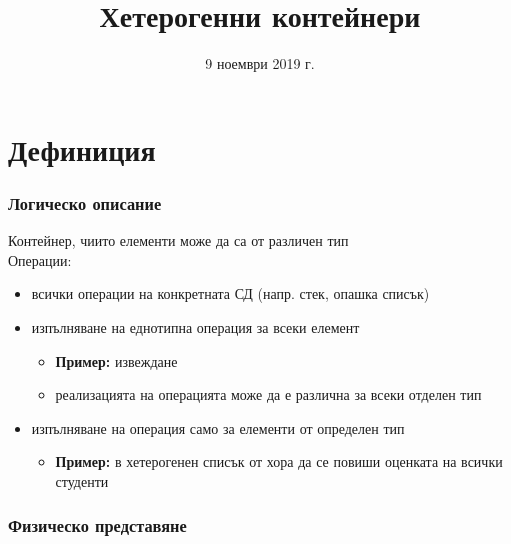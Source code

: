 \documentclass[alsotrans]{beamerswitch}
\title{Хетерогенни контейнери}
\date{9 ноември 2019 г.}
\begin{document}
\begin{frame}
  \titlepage
\end{frame}

\section{Дефиниция}

\begin{frame}
  \frametitle{Логическо описание}
  Контейнер, чиито елементи може да са от различен тип\\[2ex]
  Операции:
  \begin{itemize}
  \item всички операции на конкретната СД (напр. стек, опашка списък)
  \item изпълняване на еднотипна операция за всеки елемент
    \begin{itemize}
    \item \textbf{Пример:} извеждане
    \item реализацията на операцията може да е различна за всеки отделен тип
    \end{itemize}
  \item изпълняване на операция само за елементи от определен тип
    \begin{itemize}
    \item \textbf{Пример:} в хетерогенен списък от хора да се повиши оценката на всички студенти
    \end{itemize}
  \end{itemize}
\end{frame}

\begin{frame}
  \frametitle{Физическо представяне}
  \begin{center}
    \scriptsize
  \end{center}
\end{frame}
\end{document}
